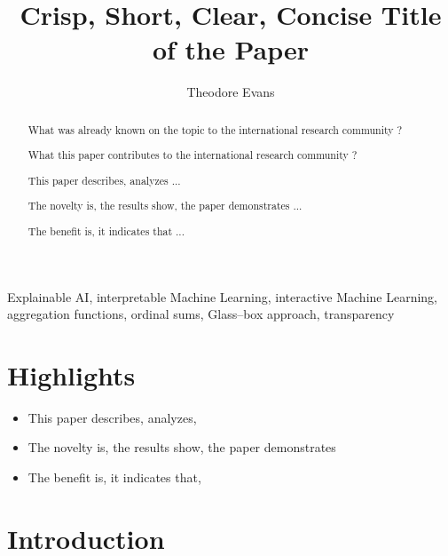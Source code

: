 \documentclass[a4paper,5p,review]{elsarticle}
\def\corref#1{}%
\begin{document}
\begin{frontmatter}

\title{Crisp, Short, Clear, Concise Title of the Paper}

\author[TUB]{Theodore Evans}

\address[TUB]{Technical University Berlin}
\address[MUG]{Medical University Graz, Austria}
\address[amii]{Alberta Machine Intelligence Institute, Canada}
\address[xxx]{Lab Name, University Name, Address}

\begin{abstract} 
What was already known on the topic to the international research community ?

What this paper contributes to the international research community ?

This paper describes, analyzes  ...

The novelty is, the results show, the paper demonstrates ...

The benefit is, it indicates that ...

\end{abstract}

\begin{keyword}
Explainable AI, interpretable Machine Learning, interactive Machine Learning, aggregation functions, ordinal sums, Glass--box approach, transparency 
\end{keyword}

\end{frontmatter}
\linenumbers

\section*{\textbf{Highlights}}

\begin{itemize}
    \item This paper describes, analyzes, 
    \item The novelty is, the results show, the paper demonstrates
    \item The benefit is, it indicates that, 
\end{itemize}

\section{Introduction}
\label{sec:Introduction}
\end{document}
